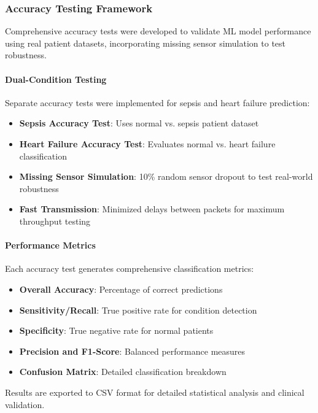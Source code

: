 \subsubsection{Accuracy Testing Framework}

Comprehensive accuracy tests were developed to validate ML model performance using real patient datasets, incorporating missing sensor simulation to test robustness.

\paragraph{Dual-Condition Testing}
Separate accuracy tests were implemented for sepsis and heart failure prediction:

\begin{itemize}
    \item \textbf{Sepsis Accuracy Test}: Uses normal vs. sepsis patient dataset
    \item \textbf{Heart Failure Accuracy Test}: Evaluates normal vs. heart failure classification
    \item \textbf{Missing Sensor Simulation}: 10\% random sensor dropout to test real-world robustness
    \item \textbf{Fast Transmission}: Minimized delays between packets for maximum throughput testing
\end{itemize}

\paragraph{Performance Metrics}
Each accuracy test generates comprehensive classification metrics:

\begin{itemize}
    \item \textbf{Overall Accuracy}: Percentage of correct predictions
    \item \textbf{Sensitivity/Recall}: True positive rate for condition detection
    \item \textbf{Specificity}: True negative rate for normal patients
    \item \textbf{Precision and F1-Score}: Balanced performance measures
    \item \textbf{Confusion Matrix}: Detailed classification breakdown
\end{itemize}

Results are exported to CSV format for detailed statistical analysis and clinical validation.


